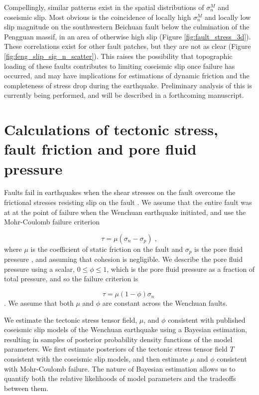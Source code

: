 \documentclass[draft,jgrga]{AGUTeX}
\begin{document}
\begin{article}
Compellingly, similar patterns exist in the spatial distributions of
$\sigma^M_n$ and coseismic slip. Most obvious is the coincidence of
locally high $\sigma^M_n$ and locally low slip magnitude on the
southwestern Beichuan fault below the culmination of the Pengguan
massif, in an area of otherwise high slip (Figure
\ref{fig:fault_stress_3d}). These correlations exist for other fault
patches, but they are not as clear (Figure
\ref{fig:feng_slip_sig_n_scatter}). This raises the possibility that
topographic loading of these faults contributes to limiting coseismic
slip once failure has occurred, and
may have implications for estimations of dynamic friction and the
completeness of stress drop during the earthquake. Preliminary analysis
of this is currently being performed, and will be described in a
forthcoming manuscript.

\section{Calculations of tectonic stress, fault friction and pore fluid
pressure}\label{calculations-of-tectonic-stress-fault-friction-and-pore-fluid-pressure}

Faults fail in earthquakes when the shear stresses on the fault overcome
the frictional stresses resisting slip on the fault \citep[e.g.,][]
{scholz2002}. We assume that the entire fault was at at the point of
failure when the Wenchuan earthquake initiated, and use the Mohr-Coulomb
failure criterion

\begin{equation} 
\tau = \mu ( \sigma_n - \sigma_p ) \; ,
\label{eqn:amonton_raw} 
\end{equation}
where $\mu$ is the coefficient of static friction on the fault and
$\sigma_p$ is the pore fluid pressure \citep[e.g.,][]{sibson1985}, and
assuming that cohesion is negligible. We
describe the pore fluid pressure using a scalar, $0 \leq \phi \leq 1$,
which is the pore fluid pressure as a fraction of total pressure, and so
the failure criterion is

\begin{equation} 
\tau = \mu (1 - \phi) \sigma_n \; 
\label{eqn:amonton} 
\end{equation}
\citep[e.g.,][]{sibson1985}. We assume that both $\mu$ and $\phi$ are
constant across the Wenchuan faults.

We estimate the tectonic stress tensor field, $\mu$, and $\phi$
consistent with published coseismic slip models of the Wenchuan
earthquake using a Bayesian estimation, resulting in samples of posterior probability 
density functions of the model parameters. 
We first estimate posteriors of the tectonic stress tensor field 
$T$ consistent with
the coseismic slip models, and then estimate $\mu$ and $\phi$ consistent
with Mohr-Coulomb failure. The nature of Bayesian estimation allows us
to quantify both the relative likelihoods of model parameters and the
tradeoffs between them.


\end{article}
\end{document}
